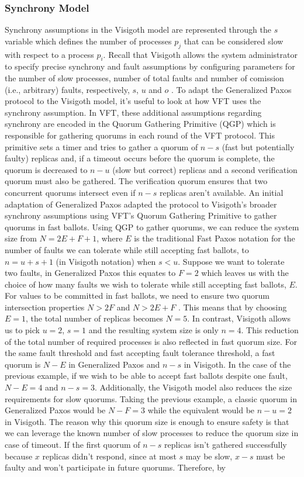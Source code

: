 \documentclass[runningheads,a4paper]{llncs}
\begin{document}
\subsubsection{Synchrony Model}
Synchrony assumptions in the Visigoth model are represented through the $s$ variable which defines the number of processes $p_j$ that can be considered slow with respect to a process $p_i$. Recall that Visigoth allows the system administrator to specify precise synchrony and fault assumptions by configuring parameters for the number of slow processes, number of total faults and number of comission (i.e., arbitrary) faults, respectively, $s$, $u$ and $o$ \cite{Porto2015}. To adapt the Generalized Paxos protocol to the Visigoth model, it's useful to look at how VFT uses the synchrony assumption. In VFT, these additional assumptions regarding synchrony are encoded in the Quorum Gathering Primitive (QGP) which is responsible for gathering quorums in each round of the VFT protocol. This primitive sets a timer and tries to gather a quorum of $n-s$ (fast but potentially faulty) replicas  and, if a timeout occurs before the quorum is complete, the quorum is decreased to $n-u$ (slow but correct) replicas and a second verification quorum must also be gathered. The verification quorum ensures that two concurrent quorums intersect even if $n-s$ replicas aren't available. An initial adaptation of Generalized Paxos adapted the protocol to Visigoth's broader synchrony assumptions using VFT's Quorum Gathering Primitive to gather quorums in fast ballots. Using QGP to gather quorums, we can reduce the system size from $N=2E+F+1$, where $E$ is the traditional Fast Paxos notation for the number of faults we can tolerate while still accepting fast ballots, to $n=u+s+1$ (in Visigoth notation) when $s < u$. Suppose we want to tolerate two faults, in Generalized Paxos this equates to $F = 2$ which leaves us with the choice of how many faults we wish to tolerate while still accepting fast ballots, $E$. For values to be committed in fast ballots, we need to ensure two quorum intersection properties $N > 2F$ and $N > 2E+F$ \cite{Lamport2006}. This means that by choosing $E=1$, the total number of replicas becomes $N = 5$. In contrast, Visigoth allows us to pick $u = 2$, $s = 1$ and the resulting system size is only $n = 4$. This reduction of the total number of required processes is also reflected in fast quorum size. For the same fault threshold and fast accepting fault tolerance threshold, a fast quorum is $N-E$ in Generalized Paxos and $n-s$ in Visigoth. In the case of the previous example, if we wish to be able to accept fast ballots despite one fault, $N-E = 4$ and $n-s=3$. Additionally, the Visigoth model also reduces the size requirements for slow quorums. Taking the previous example, a classic quorum in Generalized Paxos would be $N-F = 3$ while the equivalent would be $n-u=2$ in Visigoth. The reason why this quorum size is enough to ensure safety is that we can leverage the known number of slow processes to reduce the quorum size in case of timeout. If the first quorum of $n-s$ replicas isn't gathered successfully because $x$ replicas didn't respond, since at most $s$ may be slow, $x-s$ must be faulty and won't participate in future quorums.  Therefore, by 
\end{document}
